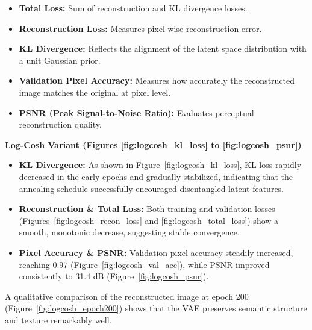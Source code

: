 \begin{itemize}
    \item \textbf{Total Loss:} Sum of reconstruction and KL divergence losses.
    \item \textbf{Reconstruction Loss:} Measures pixel-wise reconstruction error.
    \item \textbf{KL Divergence:} Reflects the alignment of the latent space distribution with a unit Gaussian prior.
    \item \textbf{Validation Pixel Accuracy:} Measures how accurately the reconstructed image matches the original at pixel level.
    \item \textbf{PSNR (Peak Signal-to-Noise Ratio):} Evaluates perceptual reconstruction quality.
\end{itemize}

\textbf{Log-Cosh Variant (Figures \ref{fig:logcosh_kl_loss} to \ref{fig:logcosh_psnr})}

\begin{itemize}
    \item \textbf{KL Divergence:} As shown in Figure~\ref{fig:logcosh_kl_loss}, KL loss rapidly decreased in the early epochs and gradually stabilized, indicating that the annealing schedule successfully encouraged disentangled latent features.
    \item \textbf{Reconstruction \& Total Loss:} Both training and validation losses (Figures~\ref{fig:logcosh_recon_loss} and \ref{fig:logcosh_total_loss}) show a smooth, monotonic decrease, suggesting stable convergence.
    \item \textbf{Pixel Accuracy \& PSNR:} Validation pixel accuracy steadily increased, reaching 0.97 (Figure~\ref{fig:logcosh_val_acc}), while PSNR improved consistently to 31.4 dB (Figure~\ref{fig:logcosh_psnr}).
\end{itemize}

A qualitative comparison of the reconstructed image at epoch 200 (Figure~\ref{fig:logcosh_epoch200}) shows that the VAE preserves semantic structure and texture remarkably well.

